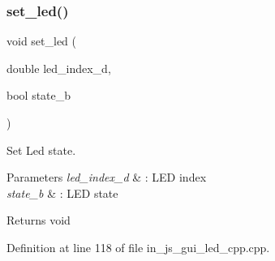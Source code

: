 \mbox{\label{group___l_e_d_gac16fc30ed179b55c65defff40a9b8076}} 
\subsubsection{set\_led()}
{\footnotesize\ttfamily void set\+\_\+led (\begin{DoxyParamCaption}\item[{double}]{led\+\_\+index\+\_\+d,  }\item[{bool}]{state\+\_\+b }\end{DoxyParamCaption})}



Set Led state. 


\begin{DoxyParams}{Parameters}
{\em led\+\_\+index\+\_\+d} & \+: L\+ED index \\
\hline
{\em state\+\_\+b} & \+: L\+ED state \\
\hline
\end{DoxyParams}
\begin{DoxyReturn}{Returns}
void 
\end{DoxyReturn}


Definition at line 118 of file in\+\_\+js\+\_\+gui\+\_\+led\+\_\+cpp.\+cpp.


